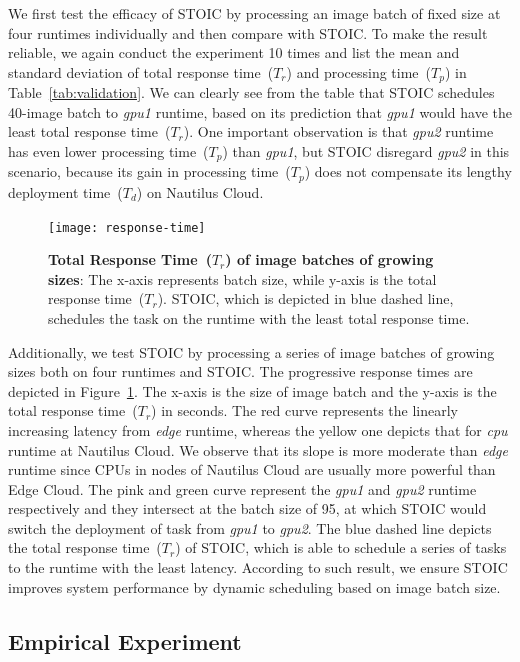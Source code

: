 We first test the efficacy of STOIC by processing an image batch of fixed size at four runtimes individually and then compare with STOIC. To make the result reliable, we again conduct the experiment 10 times and list the mean and standard deviation of total response time~($T_r$) and processing time~($T_p$) in Table~\ref{tab:validation}. We can clearly see from the table that STOIC schedules 40-image batch to \textit{gpu1} runtime, based on its prediction that  \textit{gpu1} would have the least total response time~($T_r$). One important observation is that \textit{gpu2} runtime has even lower processing time~($T_p$) than \textit{gpu1}, but STOIC disregard \textit{gpu2} in this scenario, because its gain in processing time~($T_p$) does not compensate its lengthy deployment time~($T_d$) on Nautilus Cloud.

\begin{figure}[t] \centering 
\texttt{[image: response-time]}
\caption{\textbf{Total Response Time~($T_r$) of image batches of growing sizes}: The x-axis represents batch size, while y-axis is the total response time~($T_r$). STOIC, which is depicted in blue dashed line, schedules the task on the runtime with the least total response time.  
\label{fig:response-time}}
\end{figure}

Additionally, we test STOIC by processing a series of image batches of growing sizes both on four runtimes and STOIC. The progressive response times are depicted in Figure~\ref{fig:response-time}. The x-axis is the size of image batch and the y-axis is the total response time~($T_r$) in seconds. The red curve represents the linearly increasing latency from \textit{edge} runtime, whereas the yellow one depicts that for \textit{cpu} runtime at Nautilus Cloud. We observe that its slope is more moderate than \textit{edge} runtime since CPUs in nodes of Nautilus Cloud are usually more powerful than Edge Cloud. The pink and green curve represent the \textit{gpu1} and \textit{gpu2} runtime respectively and they intersect at the batch size of 95, at which STOIC would switch the deployment of task from \textit{gpu1} to \textit{gpu2}. The blue dashed line depicts the total response time~($T_r$) of STOIC, which is able to schedule a series of tasks to the runtime with the least latency. According to such result, we ensure STOIC improves system performance by dynamic scheduling based on image batch size.


\subsection{Empirical Experiment}


